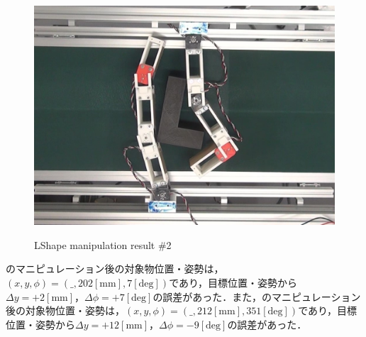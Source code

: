 \documentclass[a4paper,twoside,12pt,papersize, dvipdfmx]{iirthesis}
\begin{document}
\begin{figure}[b]
\begin{minipage}{0.249\hsize}
\subcaption{}\label{}
\end{minipage}\hfill
\begin{minipage}{0.249\hsize}
\centering
\includegraphics[width=0.98\hsize]{fig/4-manipulation-result/LShape/2-4.jpg}
\subcaption{}\label{}
\end{minipage}
\caption{LShape manipulation result \#2}\label{fig::result::lm2}
\end{figure}

のマニピュレーション後の対象物位置・姿勢は，$(x, y, \phi) = (\_, 202 \mathrm{[mm]}, 7 \mathrm{[deg]})$であり，目標位置・姿勢から$\Delta y = +2 \mathrm{[mm]}$，$\Delta \phi = +7 \mathrm{[deg]}$の誤差があった．また，のマニピュレーション後の対象物位置・姿勢は，$(x, y, \phi) = (\_, 212 \mathrm{[mm]}, 351 \mathrm{[deg]})$であり，目標位置・姿勢から$\Delta y = +12 \mathrm{[mm]}$，$\Delta \phi = -9 \mathrm{[deg]}$の誤差があった．\par
\end{document}
